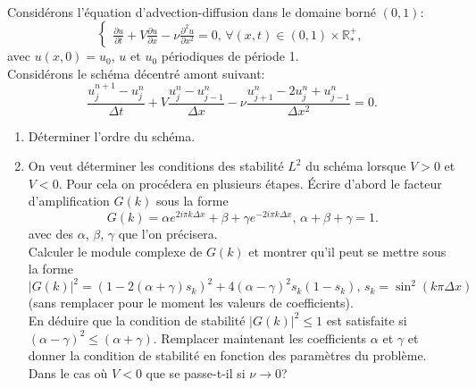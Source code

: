 \documentclass[12pt,a4paper]{article}
\begin{document}
 \\ %

\noindent Consid\'erons l'\'equation d'advection-diffusion dans le domaine born\'e $(0,1)$:
$$
\begin{cases}
\displaystyle\frac{\partial u}{\partial t}+V\frac{\partial u}{\partial
  x}-\nu\frac{\partial^2u}{\partial x^2}=0,\, \forall (x,t)\in(0,1)\times\mathbb{R}^+_*,
\end{cases}
$$
avec $u(x, 0) = u_0$, $u$ et $u_0$ p\'eriodiques de p\'eriode 1.\\
Consid\'erons le sch\'ema d\'ecentr\'e amont suivant:
$$
\frac{u_j^{n+1}-u_{j}^{n}}{\Delta t}+V
\frac{u_{j}^{n}-u_{j-1}^{n}}{\Delta x}-\nu\frac{u_{j+1}^{n}-2u_j^n+u_{j-1}^{n}}{\Delta x^2}=0.
$$
\begin{enumerate}
\item D\'eterminer l'ordre du sch\'ema. 
\item On veut d\'eterminer les conditions des stabilit\'e $L^2$ du sch\'ema lorsque $V > 0$ et
$V < 0$. Pour cela on proc\'edera en plusieurs \'etapes. \'Ecrire
d'abord le facteur d'amplification $G(k)$ sous la forme
$$
G(k)=\alpha e^{2i\pi k\Delta x}+\beta +\gamma  e^{-2i\pi k\Delta x},\, \alpha+\beta+\gamma=1.
$$
avec des $\alpha$, $\beta$, $\gamma$ que l'on pr\'ecisera. \\

\noindent Calculer le module complexe de $G(k)$ et montrer qu'il peut se mettre
sous la forme
$$
|G(k)|^2=(1-2(\alpha+\gamma)s_k)^2+4(\alpha-\gamma)^2s_k(1-s_k),\, s_k=\sin^2(k\pi\Delta x)
$$
(sans remplacer pour le moment les valeurs de coefficients). \\

\noindent En d\'eduire que la condition de stabilit\'e
$|G(k)|^2 \le 1$ est satisfaite si $(\alpha-\gamma)^2\le (\alpha+\gamma)$.
Remplacer maintenant les coefficients $\alpha$ et $\gamma$ et donner
la condition de stabilit\'e en fonction des param\`etres du
probl\`eme. Dans le cas o\`u $V < 0$ que se passe-t-il si $\nu\rightarrow 0$? 
\end{enumerate}

 \\ 
\end{document}
